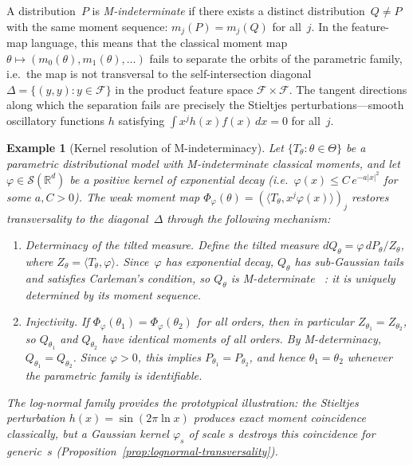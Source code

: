 \documentclass[11pt,a4paper]{article}
\newtheorem{example}[theorem]{Example}
\newcommand{\R}{\mathbb{R}}
\newcommand{\cS}{\mathcal{S}}
\begin{document}
A distribution~$P$ is \emph{M-indeterminate} if there exists a
distinct distribution~$Q\neq P$ with the same moment sequence:
$m_j(P) = m_j(Q)$ for all~$j$.  In the feature-map language, this
means that the classical moment map
$\theta \mapsto (m_0(\theta), m_1(\theta), \ldots)$ fails to separate
the orbits of the parametric family, i.e.\ the map is not transversal
to the self-intersection diagonal
$\Delta = \{(y,y) : y \in \mathcal{F}\}$ in the product feature space
$\mathcal{F}\times\mathcal{F}$.  The tangent directions along which
the separation fails are precisely the Stieltjes perturbations---smooth
oscillatory functions $h$ satisfying $\int x^j h(x) f(x)\,dx = 0$ for
all~$j$.

\begin{example}[Kernel resolution of M-indeterminacy]
\label{ex:M-determinacy}
Let $\{T_\theta : \theta \in \Theta\}$ be a parametric distributional
model with M-indeterminate classical moments, and let
$\varphi \in \cS(\R^d)$ be a positive kernel of exponential
decay (i.e.\ $\varphi(x) \leq C\,e^{-a|x|^2}$ for some $a, C > 0$).
The weak moment map
$\Phi_\varphi(\theta) = (\langle T_\theta, x^j \varphi(x)\rangle)_{j}$
restores transversality to the diagonal~$\Delta$ through the following
mechanism:
\begin{enumerate}
\item[(i)] \emph{Determinacy of the tilted measure.}  Define the
  tilted measure $dQ_\theta = \varphi\, dP_\theta / Z_\theta$, where
  $Z_\theta = \langle T_\theta, \varphi \rangle$.  Since~$\varphi$
  has exponential decay, $Q_\theta$ has sub-Gaussian tails and
  satisfies Carleman's condition, so $Q_\theta$ is M-determinate
  ~\cite[Theorem~6.4]{A}: it is uniquely determined by its moment sequence.

\item[(ii)] \emph{Injectivity.}  If
  $\Phi_\varphi(\theta_1) = \Phi_\varphi(\theta_2)$ for all orders,
  then in particular $Z_{\theta_1} = Z_{\theta_2}$, so
  $Q_{\theta_1}$ and $Q_{\theta_2}$ have identical moments of all
  orders.  By M-determinacy, $Q_{\theta_1} = Q_{\theta_2}$.  Since
  $\varphi > 0$, this implies $P_{\theta_1} = P_{\theta_2}$, and
  hence $\theta_1 = \theta_2$ whenever the parametric family is
  identifiable.
\end{enumerate}

The log-normal family provides the prototypical illustration: the
Stieltjes perturbation $h(x) = \sin(2\pi\ln x)$ produces exact moment
coincidence classically, but a Gaussian kernel $\varphi_s$ of scale
$s$ destroys this coincidence for
generic~$s$ (Proposition~\ref{prop:lognormal-transversality}).
\end{example}
\end{document}
